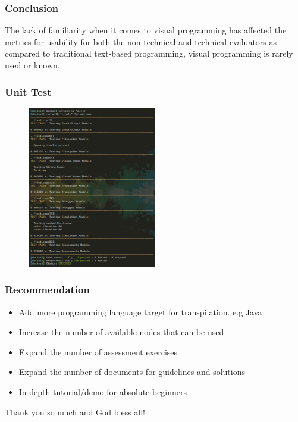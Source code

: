 \documentclass[handout]{beamer}
\newcommand{\parx}{
	\setlength{\parindent}{4em}
	\par}
\newcommand{\ui}[1]{
	\begin{frame}
		\frametitle{User-Interface Mockup and Design}
		\begin{figure}
			\texttt{[image: UI/\#1.png]}
		\end{figure}
	\end{frame}
}
\begin{document}
\begin{frame}
	\frametitle{Conclusion}
	\justifying
	\parx
	The lack of familiarity when it comes to visual programming has affected the
	metrics for usability for both the non-technical and technical evaluators
	as compared to traditional text-based programming, visual programming is
	rarely used or known.
\end{frame}

\begin{frame}
	\frametitle{Unit Test}
	\begin{figure}
		\includegraphics[width=0.5\textwidth]{figures/unit_test.png}
	\end{figure}
\end{frame}

\begin{frame}
	\frametitle{Recommendation}
	\begin{itemize}
		\item<1-> Add more programming language target for transpilation. e.g Java
		\item<2-> Increase the number of available nodes that can be used
		\item<3-> Expand the number of assessment exercises
		\item<4-> Expand the number of documents for guidelines and solutions
		\item<5-> In-depth tutorial/demo for absolute beginners
	\end{itemize}
\end{frame}


\begin{frame}
	\centering
	\huge Thank you so much and God bless all!
\end{frame}
\end{document}
